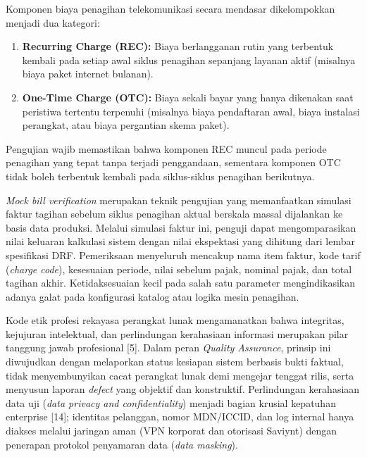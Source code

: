 \documentclass[12pt,a4paper]{article}
\begin{document}
Komponen biaya penagihan telekomunikasi secara mendasar dikelompokkan menjadi dua kategori:
\begin{enumerate}[label=\alph*),leftmargin=1.5em,itemsep=1pt,topsep=1pt,parsep=0pt]
    \item \textbf{Recurring Charge (REC):} Biaya berlangganan rutin yang terbentuk kembali pada setiap awal siklus penagihan sepanjang layanan aktif (misalnya biaya paket internet bulanan).
    \item \textbf{One-Time Charge (OTC):} Biaya sekali bayar yang hanya dikenakan saat peristiwa tertentu terpenuhi (misalnya biaya pendaftaran awal, biaya instalasi perangkat, atau biaya pergantian skema paket).
\end{enumerate}
Pengujian wajib memastikan bahwa komponen REC muncul pada periode penagihan yang tepat tanpa terjadi penggandaan, sementara komponen OTC tidak boleh terbentuk kembali pada siklus-siklus penagihan berikutnya.

\textit{Mock bill verification} merupakan teknik pengujian yang memanfaatkan simulasi faktur tagihan sebelum siklus penagihan aktual berskala massal dijalankan ke basis data produksi. Melalui simulasi faktur ini, penguji dapat mengomparasikan nilai keluaran kalkulasi sistem dengan nilai ekspektasi yang dihitung dari lembar spesifikasi DRF. Pemeriksaan menyeluruh mencakup nama item faktur, kode tarif (\textit{charge code}), kesesuaian periode, nilai sebelum pajak, nominal pajak, dan total tagihan akhir. Ketidaksesuaian kecil pada salah satu parameter mengindikasikan adanya galat pada konfigurasi katalog atau logika mesin penagihan.

\vspace{0.25cm}
Kode etik profesi rekayasa perangkat lunak mengamanatkan bahwa integritas, kejujuran intelektual, dan perlindungan kerahasiaan informasi merupakan pilar tanggung jawab profesional [5]. Dalam peran \textit{Quality Assurance}, prinsip ini diwujudkan dengan melaporkan status kesiapan sistem berbasis bukti faktual, tidak menyembunyikan cacat perangkat lunak demi mengejar tenggat rilis, serta menyusun laporan \textit{defect} yang objektif dan konstruktif. Perlindungan kerahasiaan data uji (\textit{data privacy and confidentiality}) menjadi bagian krusial kepatuhan enterprise [14]; identitas pelanggan, nomor MDN/ICCID, dan log internal hanya diakses melalui jaringan aman (VPN korporat dan otorisasi Saviynt) dengan penerapan protokol penyamaran data (\textit{data masking}).
\end{document}
